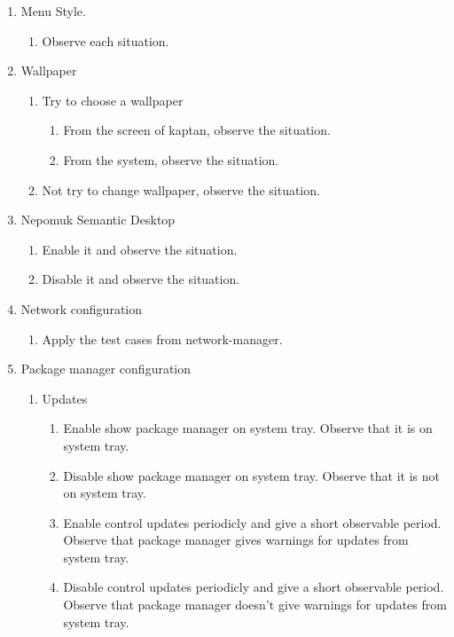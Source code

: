 \documentclass[a4paper,10pt]{article}
\begin{document}
\begin{enumerate}
\begin{enumerate}
    \item Menu Style.
        \begin{enumerate}
        \item Observe each situation.
        \end{enumerate}

    \item Wallpaper
        \begin{enumerate}
        \item Try to choose a wallpaper
            \begin{enumerate}
            \item From the screen of kaptan, observe the situation.
            \item From the system, observe the situation.
            \end{enumerate}
        \item Not try to change wallpaper, observe the situation.
        \end{enumerate}

    \item Nepomuk Semantic Desktop
        \begin{enumerate}
        \item Enable it and  observe the situation.
        \item Disable it and  observe the situation.
        \end{enumerate}

    \item Network configuration
        \begin{enumerate}
        \item Apply the test cases from network-manager.
        \end{enumerate}

    \item Package manager configuration
        \begin{enumerate}
        \item Updates
            \begin{enumerate}
            \item Enable show package manager on system tray.
                Observe that it is on system tray.
            \item Disable show package manager on system tray.
                Observe that it is not on system tray.
            \item Enable control updates periodicly and give a short observable period.
                Observe that package manager gives warnings for updates from system tray.
            \item Disable control updates periodicly and give a short observable period.
                Observe that package manager doesn't give warnings for updates from system tray.
            \end{enumerate}
        \end{enumerate}


\end{enumerate}
\end{enumerate}
\end{document}
